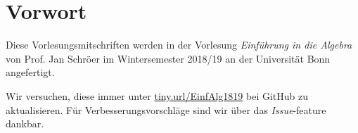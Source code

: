 \chapter*{Vorwort}
Diese Vorlesungsmitschriften werden in der Vorlesung \textit{Einführung in die Algebra} von Prof. Jan Schröer im Wintersemester 2018/19 an der Universität Bonn angefertigt.\par
Wir versuchen, diese immer unter \url{tiny.url/EinfAlg1819} bei GitHub zu aktualisieren. Für Verbesserungsvorschläge sind wir über das \textit{Issue}-feature dankbar.